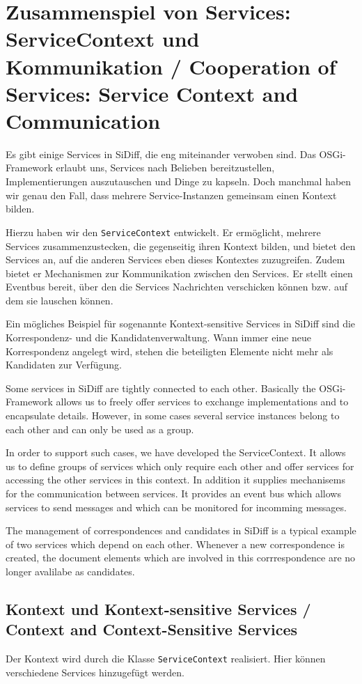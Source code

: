 \documentclass[10pt,a4paper]{scrartcl}
\providecommand{\deng}[2]{#1 / {\sffamily #2}}
\providecommand{\deutsch}[1]{#1}
\providecommand{\englisch}[1]{{\sffamily #1}}
\begin{document}
\clearpage
\section{\deng{Zusammenspiel von Services: ServiceContext und Kommunikation}{Cooperation of Services: Service Context and Communication}}
\deutsch{Es gibt einige Services in SiDiff, die eng miteinander verwoben sind. Das OSGi-Framework
erlaubt uns, Services nach Belieben bereitzustellen, Implementierungen auszutauschen und
Dinge zu kapseln. Doch manchmal haben wir genau den Fall, dass mehrere Service-Instanzen
gemeinsam einen Kontext bilden.

Hierzu haben wir den \texttt{ServiceContext} entwickelt. Er ermöglicht, mehrere
Services zusammenzustecken, die gegenseitig ihren Kontext bilden, und bietet den
Services an, auf die anderen Services eben dieses Kontextes zuzugreifen. Zudem
bietet er Mechanismen zur Kommunikation zwischen den Services. Er stellt einen
Eventbus bereit, über den die Services Nachrichten verschicken können bzw. auf
dem sie lauschen können.

Ein mögliches Beispiel für sogenannte Kontext-sensitive Services in SiDiff sind
die Korrespondenz- und die Kandidatenverwaltung. Wann immer eine neue
Korrespondenz angelegt wird, stehen die beteiligten Elemente nicht mehr als
Kandidaten zur Verfügung.
}

\englisch{Some services in SiDiff are tightly connected to each other. Basically the OSGi-Framework allows us to freely offer services to exchange implementations and to encapsulate details. However, in some cases several service instances belong to each other and can only be used as a group.

In order to support such cases, we have developed the ServiceContext. It allows us to define groups of services which only require each other and offer services for accessing the other services in this context. In addition it supplies mechanisems for the communication between services. It provides an event bus which allows services to send messages and which can be monitored for incomming messages.

The management of correspondences and candidates in SiDiff is a typical example of two services which depend on each other. Whenever a new correspondence is created, the document elements which are involved in this corrrespondence are no longer avalilabe as candidates.}


\subsection{\deng{Kontext und Kontext-sensitive Services}{Context and Context-Sensitive Services}}
\deutsch{Der Kontext wird durch die Klasse \texttt{ServiceContext} realisiert. 
Hier können verschiedene Services hinzugefügt werden.}
\end{document}
